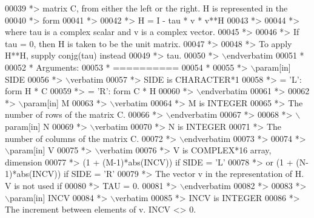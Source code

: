 \begin{DoxyCode}
00039 \textcolor{comment}{*> matrix C, from either the left or the right. H is represented in the}
00040 \textcolor{comment}{*> form}
00041 \textcolor{comment}{*>}
00042 \textcolor{comment}{*>       H = I - tau * v * v**H}
00043 \textcolor{comment}{*>}
00044 \textcolor{comment}{*> where tau is a complex scalar and v is a complex vector.}
00045 \textcolor{comment}{*>}
00046 \textcolor{comment}{*> If tau = 0, then H is taken to be the unit matrix.}
00047 \textcolor{comment}{*>}
00048 \textcolor{comment}{*> To apply H**H, supply conjg(tau) instead}
00049 \textcolor{comment}{*> tau.}
00050 \textcolor{comment}{*> \(\backslash\)endverbatim}
00051 \textcolor{comment}{*}
00052 \textcolor{comment}{*  Arguments:}
00053 \textcolor{comment}{*  ==========}
00054 \textcolor{comment}{*}
00055 \textcolor{comment}{*> \(\backslash\)param[in] SIDE}
00056 \textcolor{comment}{*> \(\backslash\)verbatim}
00057 \textcolor{comment}{*>          SIDE is CHARACTER*1}
00058 \textcolor{comment}{*>          = 'L': form  H * C}
00059 \textcolor{comment}{*>          = 'R': form  C * H}
00060 \textcolor{comment}{*> \(\backslash\)endverbatim}
00061 \textcolor{comment}{*>}
00062 \textcolor{comment}{*> \(\backslash\)param[in] M}
00063 \textcolor{comment}{*> \(\backslash\)verbatim}
00064 \textcolor{comment}{*>          M is INTEGER}
00065 \textcolor{comment}{*>          The number of rows of the matrix C.}
00066 \textcolor{comment}{*> \(\backslash\)endverbatim}
00067 \textcolor{comment}{*>}
00068 \textcolor{comment}{*> \(\backslash\)param[in] N}
00069 \textcolor{comment}{*> \(\backslash\)verbatim}
00070 \textcolor{comment}{*>          N is INTEGER}
00071 \textcolor{comment}{*>          The number of columns of the matrix C.}
00072 \textcolor{comment}{*> \(\backslash\)endverbatim}
00073 \textcolor{comment}{*>}
00074 \textcolor{comment}{*> \(\backslash\)param[in] V}
00075 \textcolor{comment}{*> \(\backslash\)verbatim}
00076 \textcolor{comment}{*>          V is COMPLEX*16 array, dimension}
00077 \textcolor{comment}{*>                     (1 + (M-1)*abs(INCV)) if SIDE = 'L'}
00078 \textcolor{comment}{*>                  or (1 + (N-1)*abs(INCV)) if SIDE = 'R'}
00079 \textcolor{comment}{*>          The vector v in the representation of H. V is not used if}
00080 \textcolor{comment}{*>          TAU = 0.}
00081 \textcolor{comment}{*> \(\backslash\)endverbatim}
00082 \textcolor{comment}{*>}
00083 \textcolor{comment}{*> \(\backslash\)param[in] INCV}
00084 \textcolor{comment}{*> \(\backslash\)verbatim}
00085 \textcolor{comment}{*>          INCV is INTEGER}
00086 \textcolor{comment}{*>          The increment between elements of v. INCV <> 0.}

\end{DoxyCode}

